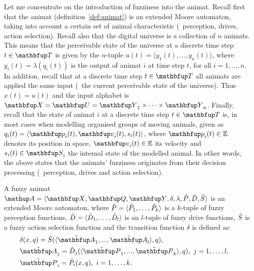 Let me concentrate on the introduction of fuzziness into the animat. Recall first that the animat (definition~\ref{def:animat}) is an extended Moore automaton, taking into account a certain set of animal characteristic (\ie\ perception, drives, action selection). Recall also that the digital universe is a collection of $n$ animats. This means that the perceivable state of the universe at a discrete time step $t \in \set{T}$ is given by the $n$-tuple $u(t)=\langle y_1(t),\ldots,y_n(t)\rangle$, where $y_i(t)=\lambda(q_i(t))$ is the output of animat $i$ at time step $t$, for all $i=1,\ldots,n$. In addition, recall that at a discrete time step $t \in \set{T}$ all animats are applied the same input (\ie\ the current perceivable state of the universe). Thus $x(t)=u(t)$ and the input alphabet is $\set{X}=\set{U}=\set{Y}_1 \times \cdots \times \set{Y}_n$. Finally, recall that the state of animat $i$ at a discrete time step $t \in \set{T}$ is, in most cases when modelling organised groups of moving animals, given as $q_i(t)=\langle \vect{p}_i(t), \vect{v}_i(t), s_i(t) \rangle$, where $\vect{p}_i(t) \in \E$ denotes its position in space, $\vect{v}_i(t) \in \E$ its velocity and $s_i(t) \in \set{S}_i$ the internal state of the modelled animal. In other words, the above states that the animats' fuzziness originates from their decision processing (\ie\ perception, drives and action selection).

\begin{definition}
\label{def:fuzzyAnimat}
A fuzzy animat $\fautom{A}=\langle\set{X},\set{Q},\set{Y},\delta,\lambda,\ffunc{P},\ffunc{D},\ffunc{S}\rangle$ is an extended Moore automaton, where ${\tilde{P}}=\langle{\ensuremath{\tilde{P}}}_1,\ldots,{\tilde{P}}_k\rangle$ is a $k$-tuple of fuzzy perception functions, ${\tilde{D}}=\langle{\ensuremath{\tilde{D}}}_1,\ldots,{\tilde{D}}_l\rangle$ is an $l$-tuple of fuzzy drive functions, ${\tilde{S}}$ is a fuzzy action selection function and the transition function $\delta$ is defined as:
\begin{eqnarray}
  & \delta(x,q) = \ffunc{S}(\langle\fset{A}_1,...,\fset{A}_l\rangle,q), & \label{eq:fuzzyAnimat:delta}\\
  & \fset{A}_j = \ffunc{D}_j(\langle\fset{P}_1,...,\fset{P}_k\rangle,q),\ j=1,\ldots,l, & \\
  & \fset{P}_i = \ffunc{P}_i(x,q),\ i=1,\ldots,k. & \label{eq:fuzzyAnimat:Pi}
\end{eqnarray}
\end{definition}

